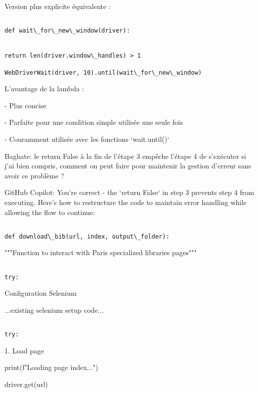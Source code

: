 Version plus explicite équivalente :

\begin{verbatim}

def wait\_for\_new\_window(driver):


return len(driver.window\_handles) > 1

WebDriverWait(driver, 10).until(wait\_for\_new\_window)

\end{verbatim}

L'avantage de la lambda :

- Plus concise

- Parfaite pour une condition simple utilisée une seule fois

- Couramment utilisée avec les fonctions `wait.until()`

Baghate: le return False à la fin de l'étape 3 empêche l'étape 4 de s'exécuter si j'ai bien compris, comment on peut faire pour maintenir la gestion d'erreur sans avoir ce problème ?

GitHub Copilot: You're correct - the `return False` in step 3 prevents step 4 from executing. Here's how to restructure the code to maintain error handling while allowing the flow to continue:

\begin{verbatim}

def download\_bib(url, index, output\_folder):

\end{verbatim}

"""Function to interact with Paris specialized libraries pages"""

\begin{verbatim}

try:

\end{verbatim}

  Configuration Selenium

  ...existing selenium setup code...

\begin{verbatim}

try:

\end{verbatim}

  1. Load page

print(f"Loading page {index}...")

driver.get(url)

